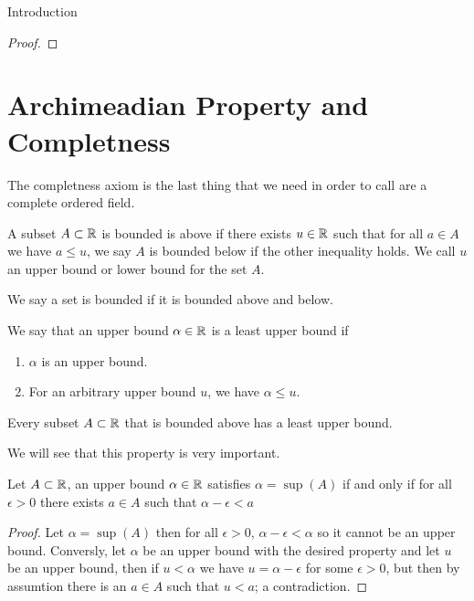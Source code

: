 \begin{chapter}{Introduction}
\begin{proof}
    \end{proof}


    \section{Archimeadian Property and Completness} 

    The completness axiom is the last thing that we need in order to call are a complete ordered field. 


    
    \begin{defn}
        A subset $A \subset \mathbb{R}$ is bounded is above if there exists $u \in \mathbb{R}$ such that for all $a \in A$ we have 
        $a \leq u$, we say $A$ is bounded below if the other inequality holds. We call $u$ an upper bound or lower bound 
        for the set $A$. 
    \end{defn}

    We say a set is bounded if it is bounded above and below. 

    
    \begin{defn}
        We say that an upper bound $\alpha \in \mathbb{R}$ is a least upper bound if 
        \begin{enumerate}
            \item $\alpha $ is an upper bound. 
            \item For an arbitrary upper bound $u$, we have $\alpha \leq u$.
        \end{enumerate}
    \end{defn}

    
    \begin{defn}
        Every subset $A \subset \mathbb{R}$ that is bounded above has a least upper bound. 
    \end{defn}

    We will see that this property is very important. 

    
    
    \begin{thm}
        Let $A \subset \mathbb{R}$, an upper bound $\alpha \in \mathbb{R}$ satisfies $\alpha = \sup(A)$ if and only if for all $\epsilon > 0$ there exists $a \in A$ such that $\alpha - \epsilon < a$
    \end{thm}

    
    \begin{proof}
        Let $\alpha = \sup(A)$ then for all $\epsilon > 0$, $\alpha - \epsilon < \alpha$ so it cannot be an upper bound. Conversly, let $\alpha $ be an upper bound with the desired property 
        and let $u$ be an upper bound, then if $u < \alpha$ we have $u = \alpha - \epsilon$ for some $\epsilon > 0$, but then by assumtion there is an $a \in A$ such that $u < a$; 
        a contradiction. 
    \end{proof}



\end{chapter}
